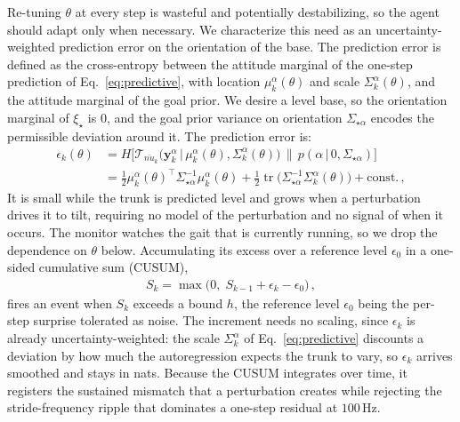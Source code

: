 \documentclass[lettersize,journal]{IEEEtran}
\DeclareMathOperator{\tr}{tr}
\newcommand{\given}[1][]{\,#1\vert\,}
\begin{document}
Re-tuning $\theta$ at every step is wasteful and potentially destabilizing, so the agent should adapt only when necessary. We characterize this need as an uncertainty-weighted prediction error on the orientation of the base. The prediction error is defined as the cross-entropy between the attitude marginal of the one-step prediction of Eq.~\ref{eq:predictive}, with location $\mu_k^{\alpha}(\theta)$ and scale $\Sigma_k^{\alpha}(\theta)$, and the attitude marginal of the goal prior. We desire a level base, so the orientation marginal of $\xi_{\star}$ is $0$, and the goal prior variance on orientation $\Sigma_{\star \alpha}$ encodes the permissible deviation around it. The prediction error is:
\begin{align} \label{eq:trigger-err}
    \epsilon_k(\theta) &= H\big[\mathcal{T}_{\bar{nu}_k}\big(\mathbf{y}_k^{\alpha} \given \mu_k^{\alpha}(\theta), \Sigma_k^{\alpha}(\theta)\big)\,\big\|\,p(\alpha \given 0, \Sigma_{\star\alpha})\big] \\
    &= \tfrac{1}{2}\mu_k^{\alpha}(\theta)^{\top} \Sigma_{\star\alpha}^{-1}\mu_k^{\alpha}(\theta) + \tfrac{1}{2}\tr \big(\Sigma_{\star\alpha}^{-1}\Sigma_k^{\alpha}(\theta)\big) + \text{const.} \,, \nonumber
\end{align}
It is small while the trunk is predicted level and grows when a perturbation drives it to tilt, requiring no model of the perturbation and no signal of when it occurs.
The monitor watches the gait that is currently running, so we drop the dependence on $\theta$ below.
Accumulating its excess over a reference level $\epsilon_0$ in a one-sided cumulative sum (CUSUM),
\begin{align} \label{eq:trigger-cusum}
    S_k = \max\big(0,\; S_{k-1} + \epsilon_k - \epsilon_0 \big) \,,
\end{align}
fires an event when $S_k$ exceeds a bound $h$, the reference level $\epsilon_0$ being the per-step surprise tolerated as noise.
The increment needs no scaling, since $\epsilon_k$ is already uncertainty-weighted: the scale $\Sigma_k^{\alpha}$ of Eq.~\ref{eq:predictive} discounts a deviation by how much the autoregression expects the trunk to vary, so $\epsilon_k$ arrives smoothed and stays in nats.
Because the CUSUM integrates over time, it registers the sustained mismatch that a perturbation creates while rejecting the stride-frequency ripple that dominates a one-step residual at $100$\,Hz.
\end{document}
